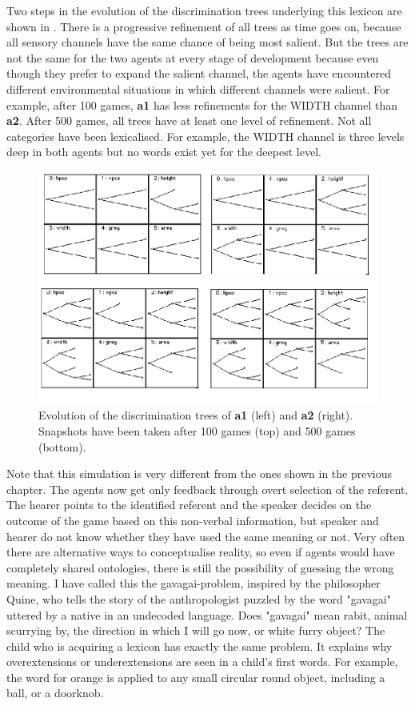Two steps in the evolution of the discrimination trees
underlying this lexicon are shown in .
There is a progressive refinement 
of all trees as time goes on, 
because all sensory channels have the same chance
of being most salient. But the trees are not 
the same for the two agents at every stage
of development because even though they prefer to expand
the salient channel, the agents have encountered 
different environmental situations in which different
channels were salient. For example, after 100 
games, {\bf a1} has less refinements for the 
WIDTH channel than {\bf a2}. 
After 500 games, all trees 
have at least one level of refinement. Not all 
categories have been lexicalised. For example, the 
WIDTH channel is three levels deep in both 
agents but no words exist yet for the deepest 
level. 
\begin{figure}[htbp]
  \centerline{\includegraphics[width=.65\textwidth]{chap6/figs/gdis}}
\caption{\label{gdis1} Evolution of the discrimination
trees of {\bf a1} (left) and {\bf a2} (right).
Snapshots have been taken after 100 games (top) and 500 
games (bottom).} 
\end{figure}

Note that this simulation is very different from the 
ones shown in the previous chapter. The agents now get 
only feedback through overt selection of the referent. 
The hearer points to the identified referent and the speaker 
decides on the outcome of the game based on this 
non-verbal information, but speaker and hearer do not 
know whether they have used the same meaning or not. 
Very often there are alternative ways
to conceptualise reality, so even if agents would have
completely shared ontologies, there is still the possibility 
of guessing the wrong meaning. I have called this
the gavagai-problem, inspired by the philosopher
Quine, who tells the story of the anthropologist 
puzzled by the word "gavagai" uttered by a native 
in an undecoded language. Does "gavagai" mean rabit, animal 
scurrying by, the direction in which I will go 
now, or white furry object? 
The child who is acquiring a lexicon has
exactly the same problem. It explains why 
overextensions or underextensions
are seen in a child's first words. For example, 
the word for orange is applied to any small circular round 
object, including a ball, or a doorknob.

